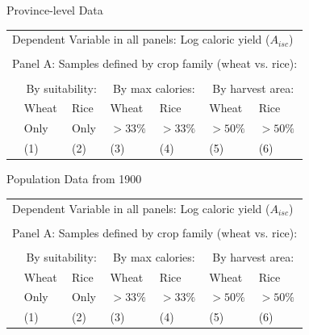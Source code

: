 \documentclass[10pt, xcolor=dvipsnames]{beamer}
\begin{document}
\begin{frame}{Province-level Data}\label{regprov}

{\footnotesize
\begin{tabularx}{\textwidth}{lXXXXXX}
\midrule
\multicolumn{7}{l}{Dependent Variable in all panels: Log caloric yield ($A_{isc}$)} \\ \\
\multicolumn{7}{l}{Panel A: Samples defined by crop family (wheat vs. rice):} \\ \\
 & \multicolumn{2}{c}{By suitability:} & \multicolumn{2}{c}{By max calories:} & \multicolumn{2}{c}{By harvest area:}\\ \cmidrule(lr){2-3} \cmidrule(lr){4-5} \cmidrule(lr){6-7} 
 & Wheat & Rice & Wheat  & Rice  & Wheat  & Rice \\
 & Only & Only &  $>33\%$ & $>33\%$ & $>50\%$ & $>50\%$   \\
 & (1) & (2) & (3) & (4) & (5) & (6) \\
\midrule

\midrule
\end{tabularx}
}

\hfill \hyperlink{robustness}{}
\end{frame}

\begin{frame}{Population Data from 1900}\label{reg1900}

{\footnotesize
\begin{tabularx}{\textwidth}{lXXXXXX}
\midrule
\multicolumn{7}{l}{Dependent Variable in all panels: Log caloric yield ($A_{isc}$)} \\ \\
\multicolumn{7}{l}{Panel A: Samples defined by crop family (wheat vs. rice):} \\ \\
 & \multicolumn{2}{c}{By suitability:} & \multicolumn{2}{c}{By max calories:} & \multicolumn{2}{c}{By harvest area:}\\ \cmidrule(lr){2-3} \cmidrule(lr){4-5} \cmidrule(lr){6-7} 
 & Wheat & Rice & Wheat  & Rice  & Wheat  & Rice \\
 & Only & Only &  $>33\%$ & $>33\%$ & $>50\%$ & $>50\%$   \\
 & (1) & (2) & (3) & (4) & (5) & (6) \\
\midrule

\midrule
\end{tabularx}
}

\hfill \hyperlink{robustness}{}
\end{frame}
\end{document}
